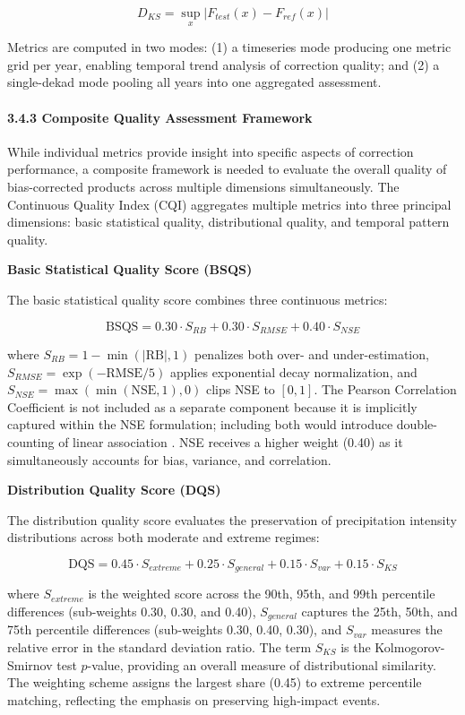 \documentclass[
]{article}
\begin{document}
\[D_{KS} = \sup_{x} |F_{test}(x) - F_{ref}(x)|\]

Metrics are computed in two modes: (1) a timeseries mode producing one
metric grid per year, enabling temporal trend analysis of correction
quality; and (2) a single-dekad mode pooling all years into one
aggregated assessment.

\paragraph{3.4.3 Composite Quality Assessment
Framework}\label{composite-quality-assessment-framework}

While individual metrics provide insight into specific aspects of
correction performance, a composite framework is needed to evaluate the
overall quality of bias-corrected products across multiple dimensions
simultaneously. The Continuous Quality Index (CQI) aggregates multiple
metrics into three principal dimensions: basic statistical quality,
distributional quality, and temporal pattern quality.

\textbf{Basic Statistical Quality Score (BSQS)}

The basic statistical quality score combines three continuous metrics:

\[\text{BSQS} = 0.30 \cdot S_{RB} + 0.30 \cdot S_{RMSE} + 0.40 \cdot S_{NSE}\]

where \(S_{RB} = 1 - \min(|\text{RB}|, 1)\) penalizes both over- and
under-estimation, \(S_{RMSE} = \exp(-\text{RMSE}/5)\) applies
exponential decay normalization, and
\(S_{NSE} = \max(\min(\text{NSE}, 1), 0)\) clips NSE to \([0, 1]\). The
Pearson Correlation Coefficient is not included as a separate component
because it is implicitly captured within the NSE formulation; including
both would introduce double-counting of linear association \cite{ref30}. NSE
receives a higher weight (0.40) as it simultaneously accounts for bias,
variance, and correlation.

\textbf{Distribution Quality Score (DQS)}

The distribution quality score evaluates the preservation of
precipitation intensity distributions across both moderate and extreme
regimes:

\[\text{DQS} = 0.45 \cdot S_{extreme} + 0.25 \cdot S_{general} + 0.15 \cdot S_{var} + 0.15 \cdot S_{KS}\]

where \(S_{extreme}\) is the weighted score across the 90th, 95th, and
99th percentile differences (sub-weights 0.30, 0.30, and 0.40),
\(S_{general}\) captures the 25th, 50th, and 75th percentile differences
(sub-weights 0.30, 0.40, 0.30), and \(S_{var}\) measures the relative
error in the standard deviation ratio. The term \(S_{KS}\) is the
Kolmogorov-Smirnov test \(p\)-value, providing an overall measure of
distributional similarity. The weighting scheme assigns the largest
share (0.45) to extreme percentile matching, reflecting the emphasis on
preserving high-impact events.
\end{document}
